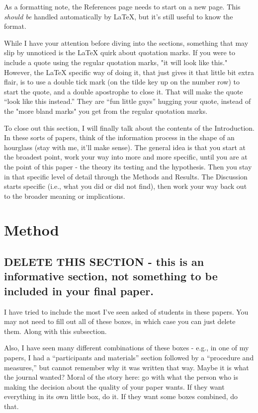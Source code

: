 \documentclass[stu,12pt,floatsintext]{apa7}
\begin{document}
As a formatting note, the References page needs to start on a new page. This \textit{should be} handled automatically by \LaTeX{}, but it's still useful to know the format.

While I have your attention before diving into the sections, something that may slip by unnoticed is the \LaTeX{} quirk about quotation marks. If you were to include a quote using the regular quotation marks, "it will look like this." However, the \LaTeX{} specific way of doing it, that just gives it that little bit extra flair, is to use a double tick mark (on the tilde key up on the number row) to start the quote, and a double apostrophe to close it. That will make the quote ``look like this instead.'' They are ``fun little guys'' hugging your quote, instead of the "more bland marks" you get from the regular quotation marks.

To close out this section, I will finally talk about the contents of the Introduction. In these sorts of papers, think of the information process in the shape of an hourglass (stay with me, it'll make sense). The general idea is that you start at the broadest point, work your way into more and more specific, until you are at the point of this paper - the theory its testing and the hypothesis. Then you stay in that specific level of detail through the Methods and Results. The Discussion starts specific (i.e., what you did or did not find), then work your way back out to the broader meaning or implications. 

\section{Method}

\subsection{DELETE THIS SECTION - this is an informative section, not something to be included in your final paper.}

I have tried to include the most I've seen asked of students in these papers. You may not need to fill out all of these boxes, in which case you can just delete them. Along with this subsection.

Also, I have seen many different combinations of these boxes - e.g., in one of my papers, I had a ``participants and materials'' section followed by a ``procedure and measures,'' but cannot remember why it was written that way. Maybe it is what the journal wanted? Moral of the story here: go with what the person who is making the decision about the quality of your paper wants. If they want everything in its own little box, do it. If they want some boxes combined, do that.
\end{document}
